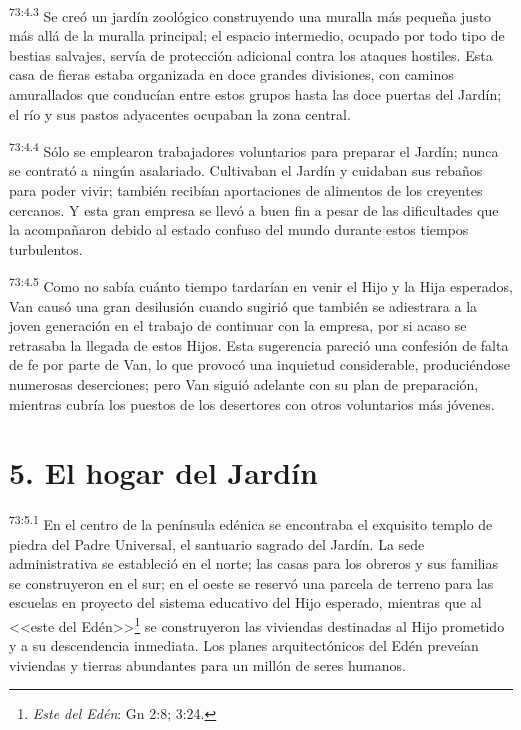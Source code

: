 \par
\textsuperscript{73:4.3} Se creó un jardín zoológico construyendo una muralla más pequeña justo más allá de la muralla principal; el espacio intermedio, ocupado por todo tipo de bestias salvajes, servía de protección adicional contra los ataques hostiles. Esta casa de fieras estaba organizada en doce grandes divisiones, con caminos amurallados que conducían entre estos grupos hasta las doce puertas del Jardín; el río y sus pastos adyacentes ocupaban la zona central.

\par
\textsuperscript{73:4.4} Sólo se emplearon trabajadores voluntarios para preparar el Jardín; nunca se contrató a ningún asalariado. Cultivaban el Jardín y cuidaban sus rebaños para poder vivir; también recibían aportaciones de alimentos de los creyentes cercanos. Y esta gran empresa se llevó a buen fin a pesar de las dificultades que la acompañaron debido al estado confuso del mundo durante estos tiempos turbulentos.

\par
\textsuperscript{73:4.5} Como no sabía cuánto tiempo tardarían en venir el Hijo y la Hija esperados, Van causó una gran desilusión cuando sugirió que también se adiestrara a la joven generación en el trabajo de continuar con la empresa, por si acaso se retrasaba la llegada de estos Hijos. Esta sugerencia pareció una confesión de falta de fe por parte de Van, lo que provocó una inquietud considerable, produciéndose numerosas deserciones; pero Van siguió adelante con su plan de preparación, mientras cubría los puestos de los desertores con otros voluntarios más jóvenes.

\section*{5. El hogar del Jardín}
\par
\textsuperscript{73:5.1} En el centro de la península edénica se encontraba el exquisito templo de piedra del Padre Universal, el santuario sagrado del Jardín. La sede administrativa se estableció en el norte; las casas para los obreros y sus familias se construyeron en el sur; en el oeste se reservó una parcela de terreno para las escuelas en proyecto del sistema educativo del Hijo esperado, mientras que al <<este del Edén>>\footnote{\textit{Este del Edén}: Gn 2:8; 3:24.} se construyeron las viviendas destinadas al Hijo prometido y a su descendencia inmediata. Los planes arquitectónicos del Edén preveían viviendas y tierras abundantes para un millón de seres humanos.

